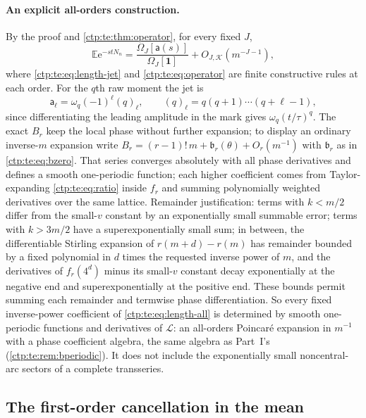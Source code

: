 \documentclass[11pt,a4paper]{article}
\numberwithin{equation}{section}
\theoremstyle{definition}
\theoremstyle{remark}
\newcommand{\e}{\mathrm e}
\newcommand{\E}{\mathbb E}
\newcommand{\LW}{\mathcal L}
\begin{document}
\paragraph{An explicit all-orders construction.} By the proof and
\cref{ctp:te:thm:operator}, for every fixed $J$,
\begin{equation}\label{ctp:te:eq:length-all}
 \E\e^{-stN_n}=\frac{\Omega_J[\mathsf a(s)]}{\Omega_J[\mathbf1]}+O_{J,\mathcal K}(m^{-J-1}),
\end{equation}
where \eqref{ctp:te:eq:length-jet} and \eqref{ctp:te:eq:operator} are finite
constructive rules at each order. For the $q$th raw moment the jet is
\begin{equation}\label{ctp:te:eq:moment-jet}
 \mathsf a_\ell=\omega_q(-1)^\ell(q)_\ell,\qquad(q)_\ell=q(q+1)\cdots(q+\ell-1),
\end{equation}
since differentiating the leading amplitude in the mark gives
$\omega_q(t/\tau)^q$. The exact $B_r$ keep the local phase without further
expansion; to display an ordinary inverse-$m$ expansion write
$B_r=(r-1)!\,m+\mathfrak b_r(\theta)+O_r(m^{-1})$ with $\mathfrak b_r$ as in
\eqref{ctp:te:eq:bzero}. That series converges absolutely with all phase
derivatives and defines a smooth one-periodic function; each higher
coefficient comes from Taylor-expanding \eqref{ctp:te:eq:ratio} inside
$f_r$ and summing polynomially weighted derivatives over the same lattice.
Remainder justification: terms with $k<m/2$ differ from the small-$v$
constant by an exponentially small summable error; terms with $k>3m/2$ have
a superexponentially small sum; in between, the differentiable Stirling
expansion of $r(m+d)-r(m)$ has remainder bounded by a fixed polynomial in
$d$ times the requested inverse power of $m$, and the derivatives of
$f_r(4^d)$ minus its small-$v$ constant decay exponentially at the negative
end and superexponentially at the positive end. These bounds permit summing
each remainder and termwise phase differentiation. So every fixed
inverse-power coefficient of \eqref{ctp:te:eq:length-all} is determined by
smooth one-periodic functions and derivatives of $\LW$: an all-orders
Poincar\'e expansion in $m^{-1}$ with a phase coefficient algebra, the same
algebra as Part~I's (\cref{ctp:te:rem:bperiodic}). It does not include the
exponentially small noncentral-arc sectors of a complete transseries.

\subsection{The first-order cancellation in the mean}
\end{document}
